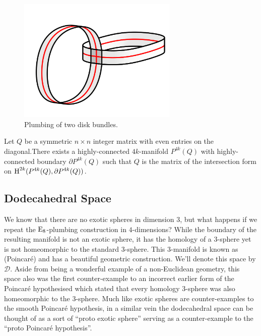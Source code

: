 \begin{figure}[ht]
	\centering
	\includegraphics[width=3in]{graphics/temp-diagrams/disk-bundle-plumbing-example.png}
	\caption{Plumbing of two disk bundles.}\label{fig:disk-bundle-plumbing-example}
\end{figure}

\begin{theorem}
	Let $Q$ be a symmetric $n\times n$ integer matrix with even entries on the diagonal.There exists a highly-connected $4k$-manifold $P^{4k}(Q)$ with highly-connected boundary $\partial P^{4k}(Q)$ such that $Q$ is the matrix of the intersection form on $\operatorname{H}^{2k}(P^{4k}(Q), \partial P^{4k}(Q))$.
\end{theorem}

\pagebreak
\subsection*{Dodecahedral Space}

We know that there are no exotic spheres in dimension $3$, but what happens if we repeat the ${\operatorname{E}}_8$-plumbing construction in $4$-dimensions? While the boundary of the resulting manifold is not an exotic sphere, it has the homology of a $3$-sphere yet is not homeomorphic to the standard $3$-sphere.
This $3$-manifold is known as (Poincar\'e)  and has a beautiful geometric construction. We'll denote this space by $\mathscr{D}$. Aside from being a wonderful example of a non-Euclidean geometry, this space also was the first counter-example to an incorrect earlier form of the Poincar\'e hypothesised which stated that every homology $3$-sphere was also homeomorphic to the $3$-sphere. Much like exotic spheres are counter-examples to the smooth Poincar\'e hypothesis, in a similar vein the dodecahedral space can be thought of as a sort of ``proto exotic sphere'' serving as a counter-example to the ``proto Poincar\'e hypothesis''.

